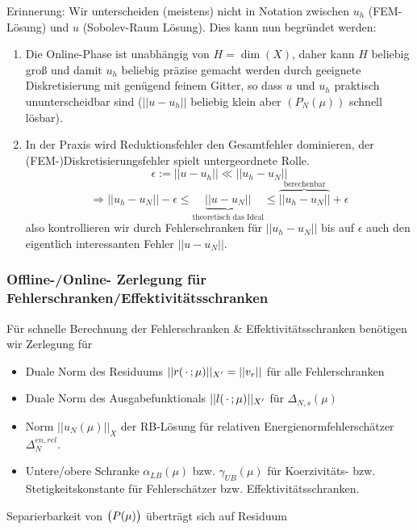 \begin{bem}
	Erinnerung: Wir unterscheiden (meistens) nicht in Notation zwischen $u_h$ (FEM-Lösung) und $u$ (Sobolev-Raum Lösung). Dies kann nun begründet werden:
	\begin{enumerate}
		\item Die Online-Phase ist unabhängig von $H = \dim(X)$, daher kann $H$ beliebig groß und damit $u_h$ beliebig präzise gemacht werden durch geeignete Diskretisierung mit genügend feinem Gitter, so dass $u$ und $u_h$ praktisch ununterscheidbar sind ($||u - u_h ||$ beliebig klein aber $(P_N(\mu))$ schnell lösbar).
		\item In der Praxis wird Reduktionsfehler den Gesamtfehler dominieren, der (FEM-)Diskretisierungsfehler spielt untergeordnete Rolle.
		\[
			\epsilon := ||u - u_h|| \ll ||u_h - u_N||
		\]
		\[
			\Rightarrow ||u_h - u_N|| - \epsilon \leq \underbrace{||u-u_N||}_{\text{theoretisch das Ideal}} \leq \overbrace{||u_h - u_N||}^{\text{berechenbar}} + \epsilon
		\]
		also kontrollieren wir durch Fehlerschranken für $||u_h - u_N||$ bis auf $\epsilon$ auch den eigentlich interessanten Fehler $||u - u_N||$.
	\end{enumerate}
\end{bem}

\subsubsection*{Offline-/Online- Zerlegung für Fehlerschranken/Effektivitätsschranken}

Für schnelle Berechnung der Fehlerschranken \& Effektivitätsschranken benötigen wir Zerlegung für
\begin{itemize}
	\item Duale Norm des Residuums $|| r(\,\cdot\, ; \mu)||_{X'} = ||v_r||$ für alle Fehlerschranken
	\item Duale Norm des Ausgabefunktionals $|| l(\,\cdot\,;\mu)||_{X'}$ für $\Delta_{N,s}(\mu)$
	\item Norm $||u_N (\mu) ||_X$ der RB-Lösung für relativen Energienormfehlerschätzer $\Delta_N^{en, rel}$.
	\item Untere/obere Schranke $\alpha_{LB}(\mu)$ bzw. $\gamma_{UB} (\mu)$ für Koerzivitäts- bzw. Stetigkeitskonstante für Fehlerschätzer bzw. Effektivitätsschranken.
\end{itemize}
Separierbarkeit von $\big(P(\mu)\big)$ überträgt sich auf Residuum

